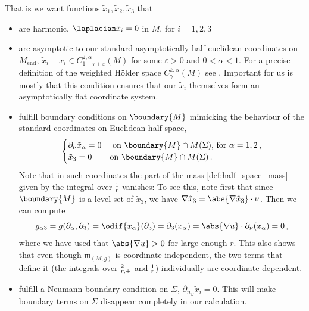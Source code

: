 \documentclass[titlepage,numbers=noenddot,oneside,%
cleardoublepage=empty,paper=a4,fontsize=11pt,%
english,%
]{scrartcl}
\newcommand*{\mathcomma}{\,,}
\newcommand*{\mathfullstop}{\,.}
\let\sphere\relax
\newcommand{\sphere}{\mathbb{S}}
\newcommand{\Mend}{M_{\mathrm{end}}} %
\newcommand{\mass}[2]{\mathfrak{m}_{(#1,#2)}} %
\begin{document}
That is we want functions \( \tilde{x}_1,\tilde{x}_2,\tilde{x}_3 \) that
\begin{itemize}
    \item are harmonic, \ie \( \laplacian \tilde{x}_i=0 \) in \( M \), for \( i=1,2,3 \)
    \item are asymptotic to our standard asymptotically half-euclidean coordinates on \(  \Mend \), \ie \( \tilde{x}_i-x_i\in C_{1-\tau+\varepsilon}^{2,\alpha}(M) \) for some \( \varepsilon>0 \) and \( 0<\alpha<1 \). 
    For a precise definition of the weighted Hölder space \( C_\gamma^{k,\alpha}(M) \) see \cite[Section 3]{almarazPositiveMassTheorem2016}.
    Important for us is mostly that this condition ensures that our \( \tilde{x}_i \) themselves form an asymptotically flat coordinate system.


    \item fulfill boundary conditions on \( \boundary{M} \) mimicking the behaviour of the standard coordinates on Euclidean half-space, \ie
    \begin{equation*}
        \begin{cases}
            \partial_\nu \tilde{x}_\alpha=0 &\text{ on \( \boundary{M} \cap M(\Sigma) \), for \( \alpha=1,2 \)\mathcomma}\\
            \tilde{x}_3=0 &\text{on \( \boundary{M}\cap M(\Sigma) \)}\mathfullstop
        \end{cases}
    \end{equation*}
    Note that in such coordinates the part of the mass \cref{def:half_space_mass} given by the integral over \( \sphere^1_r \) vanishes: To see this, note first that since \( \boundary{M} \) is a level set of \( \tilde{x}_3 \), we have \( \nabla \tilde{x}_3=\abs{\nabla \tilde{x}_3}\cdot \nu \). Then we can compute
    \begin{equation}
        g_{\alpha 3}=g(\partial_\alpha,\partial_3)=\odif{x_{\alpha}}(\partial_3)=\partial_{3}(x_\alpha)=\abs{\nabla u}\cdot \partial_\nu (x_\alpha)=0\mathcomma\label{eq:mass_expression_simplifies}
    \end{equation}
    where we have used that \( \abs{\nabla u}>0 \) for large enough \( r \). This also shows that even though \( \mass{M}{g} \) is coordinate independent, the two terms that define it (the integrals over \( \sphere^2_{r,+} \) and \( \sphere_r^1 \)) individually are coordinate dependent.

    \item fulfill a Neumann boundary condition on \( \Sigma \), \ie \( \partial_{n_\Sigma}\tilde{x}_i=0 \). This will make boundary terms on \( \Sigma \) disappear completely in our calculation.
\end{itemize} 
\end{document}
